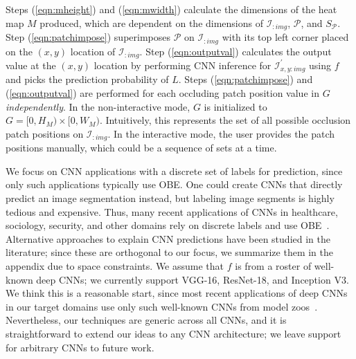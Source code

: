 Steps (\ref{eqn:mheight}) and (\ref{eqn:mwidth}) calculate the dimensions of the heat map $M$ produced, which are dependent on the dimensions of $\mathcal{I}_{:img}$, $\mathcal{P}$, and $S_\mathcal{P}$.
Step (\ref{eqn:patchimpose}) superimposes $\mathcal{P}$ on $\mathcal{I}_{:img}$ with its top left corner placed on the $(x,y)$ location of $\mathcal{I}_{:img}$.
Step (\ref{eqn:outputval}) calculates the output value at the $(x,y)$ location by performing CNN inference for $\mathcal{I}^{'}_{x,y:img}$ using $f$ and picks the prediction probability of $L$.
Steps (\ref{eqn:patchimpose}) and (\ref{eqn:outputval}) are performed for each occluding patch position value in $G$ \textit{independently}.
In the non-interactive mode, $G$ is initialized to $G = [0, H_M) \times [0, W_M)$. Intuitively, this represents the set of all possible occlusion patch positions on $\mathcal{I}_{:img}$. In the interactive mode, the user provides the patch positions manually, which could be a sequence of sets at a time.

We focus on CNN applications with a discrete set of labels for prediction, since only such applications typically use OBE. One could create CNNs that directly predict an image segmentation instead, but labeling image segments is highly tedious and expensive. Thus, many recent applications of CNNs in healthcare, sociology, security, and other domains rely on discrete labels and use OBE~\cite{kermany2018identifying, islam2017abnormality, mohanty2016using, arbabzadah2016identifying, wang2017deep}. Alternative approaches to explain CNN predictions have been studied in the literature; since these are orthogonal to our focus, we summarize them in the appendix due to space constraints.
We assume that $f$ is from a roster of well-known deep CNNs; we currently support VGG-16, ResNet-18, and Inception V3. We think this is a reasonable start, since most recent applications of deep CNNs in our target domains use only such well-known CNNs from model zoos~\cite{caffemodelzoo, tfmodelzoo}. Nevertheless, our techniques are generic across all CNNs, and it is straightforward to extend our ideas to any CNN architecture; we leave support for arbitrary CNNs to future work.

